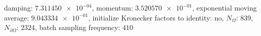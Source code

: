 damping: $\num[scientific-notation=true]{7.311450e-04}$, momentum: $\num[scientific-notation=true]{3.520570e-01}$, exponential moving average: $\num[scientific-notation=true]{9.043334e-01}$, initialize Kronecker factors to identity: $\text{no}$, $N_{\Omega}$: $\num[scientific-notation=false]{839}$, $N_{\partial\Omega}$: $\num[scientific-notation=false]{2324}$, batch sampling frequency: $\num[scientific-notation=false]{410}$